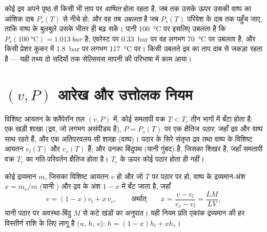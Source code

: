 \begin{remark}\label{rem:b1:phase-changes:boiling}
कोई द्रव अपने पृष्ठ से किसी भी ताप पर \emph{वाष्पित} होता रहता है, जब तक
उसके ऊपर उसकी वाष्प का आंशिक दाब $P_s(T)$ से नीचे हो; और वह तब
\emph{उबलता} है जब $P_s(T)$ परिवेश के दाब तक पहुँच जाए, ताकि वाष्प के
बुलबुले उसके भीतर ही बढ़ सकें। पानी \qty{100}{\degreeCelsius} पर इसलिए
उबलता है कि $P_s(\qty{100}{\degreeCelsius}) = \qty{1.013}{bar}$ है; एवरेस्ट
पर \qty{0.33}{bar} पर वह लगभग \qty{70}{\degreeCelsius} पर उबलता है, और किसी
प्रेशर कुकर में \qty{1.8}{bar} पर लगभग \qty{117}{\degreeCelsius} पर। किसी
उबलते द्रव का ताप दाब से जकड़ा रहता है --- यही तथ्य दो सदियों तक सेल्सियस
मापनी की परिभाषा में काम आया।
\end{remark}

\section{$(v, P)$ आरेख और उत्तोलक नियम}

\begin{proposition}[ऐंड्रूज़ के समतापी वक्र]\label{prop:b1:phase-changes:andrews}
विशिष्ट आयतन के क्लैपेरॉन तल $(v, P)$ में, कोई समतापी वक्र
$T < T_c$ तीन भागों में बँटा होता है: एक खड़ी शाखा (द्रव, जो लगभग
असंपीड्य है), $P = P_s(T)$ पर एक क्षैतिज \emph{पठार}, जहाँ द्रव और वाष्प
साथ रहते हैं, और एक अतिपरवलय-सी शाखा (वाष्प)। पठार के सिरे संतृप्त द्रव तथा
वाष्प के विशिष्ट आयतन $v_l(T)$ और $v_v(T)$ हैं; और उनका बिंदुपथ
\emph{} (यानी गुंबद) है, जिसका शिखर  है, जहाँ
समतापी वक्र $T_c$ का नति-परिवर्तन क्षैतिज होता है। $T_c$ के ऊपर कोई पठार
होता ही नहीं।
\end{proposition}
\admitted

\begin{theorem}[उत्तोलक नियम]\label{thm:b1:phase-changes:lever}
कोई द्रव्यमान $m$, जिसका विशिष्ट आयतन $v$ हो और जो $T$ पर पठार पर हो, वाष्प के
द्रव्यमान-अंश $x = m_v/m$ (यानी \emph{}) और द्रव के अंश
$1 - x$ में बँट जाता है, जहाँ
\[
v = (1 - x)v_l + x\,v_v , \qquad\text{अर्थात्}\qquad
x = \frac{v - v_l}{v_v - v_l} = \frac{LM}{LV} ,
\]
यानी पठार पर अवस्था-बिंदु $M$ से कटे खंडों का अनुपात। यही नियम प्रति एकांक
द्रव्यमान की हर विस्तीर्ण राशि के लिए लागू है ($u$,
$h$, $s$): $h = (1 - x)h_l + xh_v$।
\end{theorem}

